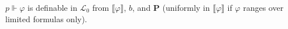 $p \Vdash \varphi$ is definable in $\mathcal{L}_0$ from $\llbracket \varphi \rrbracket$, $b$, and $\mathbf{P}$ (uniformly in $\llbracket \varphi \rrbracket$ if $\varphi$ ranges over limited formulas only).
